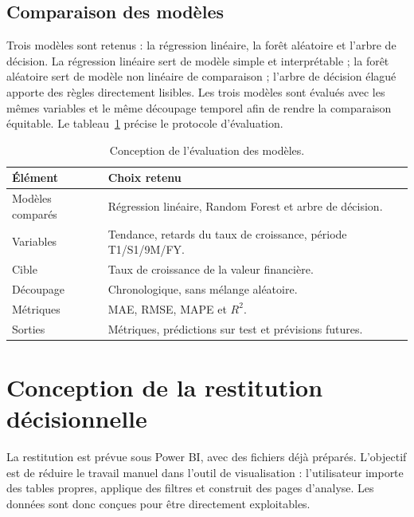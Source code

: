 \subsection{Comparaison des modèles}
\par Trois modèles sont retenus : la régression linéaire, la forêt aléatoire et
l'arbre de décision. La régression linéaire sert de modèle simple et
interprétable ; la forêt aléatoire sert de modèle non linéaire de comparaison ;
l'arbre de décision élagué apporte des règles directement lisibles. Les trois
modèles sont
évalués avec les mêmes variables et le même découpage temporel afin de rendre la
comparaison équitable. Le tableau~\ref{tab:evaluationml} précise le protocole
d'évaluation.

\begin{table}[H]
\centering
\caption[Conception de l'évaluation ML]{Conception de l'évaluation des modèles.}
\label{tab:evaluationml}
\begin{tabularx}{\linewidth}{|p{3.2cm}|X|}
\hline
\textbf{Élément} & \textbf{Choix retenu} \\ \hline
Modèles comparés & Régression linéaire, Random Forest et arbre de décision. \\ \hline
Variables & Tendance, retards du taux de croissance, période T1/S1/9M/FY. \\ \hline
Cible & Taux de croissance de la valeur financière. \\ \hline
Découpage & Chronologique, sans mélange aléatoire. \\ \hline
Métriques & MAE, RMSE, MAPE et $R^2$. \\ \hline
Sorties & Métriques, prédictions sur test et prévisions futures. \\ \hline
\end{tabularx}
\end{table}

\section{Conception de la restitution décisionnelle}
\label{sec:conception_restitution}
\par La restitution est prévue sous Power BI, avec des fichiers déjà préparés.
L'objectif est de réduire le travail manuel dans l'outil de visualisation :
l'utilisateur importe des tables propres, applique des filtres et construit des
pages d'analyse. Les données sont donc conçues pour être directement
exploitables.

